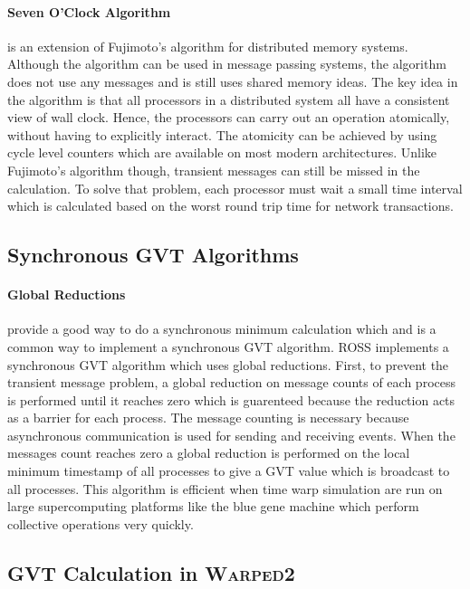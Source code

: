 \documentclass[11pt]{book}
\begin{document}
\paragraph{Seven O'Clock Algorithm}\cite{bauer-05} is an extension of Fujimoto's algorithm
for distributed memory systems. Although the algorithm can be used in message passing systems,
the algorithm does not use any messages and is still uses shared memory ideas. The key idea
in the algorithm is that all processors in a distributed system all have a consistent view
of wall clock. Hence, the processors can carry out an operation atomically, without having
to explicitly interact. The atomicity can be achieved by using cycle level counters which
are available on most modern architectures. Unlike Fujimoto's algorithm though, transient
messages can still be missed in the calculation. To solve that problem, each processor must
wait a small time interval which is calculated based on the worst round trip time for
network transactions.

\subsection{Synchronous GVT Algorithms}

\paragraph{Global Reductions} provide a good way to do a synchronous minimum calculation
which and is a common way to implement a synchronous GVT algorithm. ROSS implements a
synchronous GVT algorithm which uses global reductions\cite{holder-08}. First, to prevent
the transient message problem, a global reduction on message counts of each process is
performed until it reaches zero which is guarenteed because the reduction acts as a barrier
for each process. The message counting is necessary because asynchronous communication is
used for sending and receiving events. When the messages count reaches zero a global
reduction is performed on the local minimum timestamp of all processes to give a GVT value
which is broadcast to all processes. This algorithm is efficient when time warp simulation
are run on large supercomputing platforms like the blue gene machine which perform collective
operations very quickly.

\subsection{GVT Calculation in \textsc{Warped2}}
\end{document}
